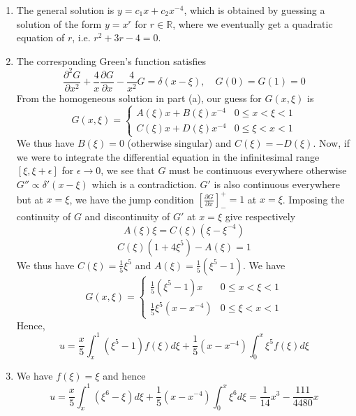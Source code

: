 \documentclass[a4paper]{article}
\begin{document}
\begin{ans}\leavevmode
\begin{enumerate}[label=(\alph*)]
\item The general solution is $y=c_1x+c_2x^{-4}$, which is obtained by guessing a solution of the form $y=x^r$ for $r\in\mathbb{R}$, where we eventually get a quadratic equation of $r$, i.e. $r^2+3r-4=0$.
\item The corresponding Green's function satisfies
$$\frac{\partial^2G}{\partial x^2}+\frac{4}{x}\frac{\partial G}{\partial x}-\frac{4}{x^2}G=\delta(x-\xi),\quad G(0)=G(1)=0$$
From the homogeneous solution in part (a), our guess for $G(x,\xi)$ is 
$$G(x,\xi)=
\left\{
        \begin{array}{ll}
      A(\xi)x+B(\xi)x^{-4} & 0\leq x<\xi<1 \\
      C(\xi)x+D(\xi)x^{-4} & 0\leq\xi<x<1
        \end{array}
    \right.$$
We thus have $B(\xi)=0$ (otherwise singular) and $C(\xi)=-D(\xi)$. Now, if we were to integrate the differential equation in the infinitesimal range $[\xi,\xi+\epsilon]$ for $\epsilon\rightarrow 0$, we see that $G$ must be continuous everywhere otherwise $G''\propto\delta'(x-\xi)$ which is a contradiction. $G'$ is also continuous everywhere but at $x=\xi$, we have the jump condition $[\frac{\partial G}{\partial x}]_-^+=1$ at $x=\xi$. Imposing the continuity of $G$ and discontinuity of $G'$ at $x=\xi$ give respectively
$$A(\xi)\xi=C(\xi)(\xi-\xi^{-4})$$
$$C(\xi)(1+4\xi^5)-A(\xi)=1$$
We thus have $C(\xi)=\frac{1}{5}\xi^5$ and $A(\xi)=\frac{1}{5}(\xi^5-1)$. We have 
$$G(x,\xi)=
\left\{
        \begin{array}{ll}
      \frac{1}{5}(\xi^5-1)x & 0\leq x<\xi<1 \\
      \frac{1}{5}\xi^5(x-x^{-4}) & 0\leq\xi<x<1
        \end{array}
    \right.$$
Hence,
$$u=\frac{x}{5}\int_x^1(\xi^5-1)f(\xi)d\xi+\frac{1}{5}(x-x^{-4})\int_0^x\xi^5f(\xi)d\xi$$
\item We have $f(\xi)=\xi$ and hence
$$u=\frac{x}{5}\int_x^1(\xi^6-\xi)d\xi+\frac{1}{5}(x-x^{-4})\int_0^x\xi^6d\xi=\frac{1}{14}x^3-\frac{111}{4480}x$$
\end{enumerate}
\end{ans}
\newpage
\end{document}
